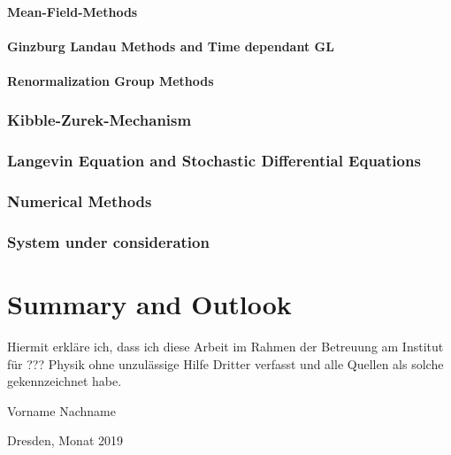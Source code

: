 	\subsubsection{Mean-Field-Methods}
	\subsubsection{Ginzburg Landau Methods and Time dependant GL}
	\subsubsection{Renormalization Group Methods}

\subsection{Kibble-Zurek-Mechanism}


\subsection{Langevin Equation and Stochastic Differential Equations}


\subsection{Numerical Methods}


\subsection{System under consideration}


\chapter{Summary and Outlook}


\clearpage
\thispagestyle{empty}
\vspace*{1.5em}

Hiermit erkläre ich, dass ich diese Arbeit im Rahmen der Betreuung am Institut
für ??? Physik ohne unzulässige Hilfe Dritter verfasst und alle Quellen als solche gekennzeichnet habe.

\vspace*{45em}

Vorname Nachname \par
Dresden, Monat 2019


